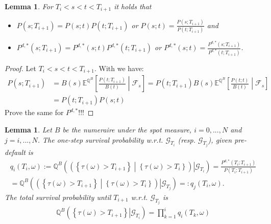\documentclass[12pt]{article}
\newtheorem{lemma}[theorem]{Lemma}
\begin{document}
	\begin{lemma}
		For $T_i < s < t < T_{i+1}$ it holds that
		\begin{itemize}
			\item $P(s;T_{i+1}) = P(s;t)P(t;T_{i+1})$ or 
			$P(s;t) = \frac{P(s;T_{i+1})}{P(t;T_{i+1})}$ and
			\item $P^{d,*}(s;T_{i+1}) = P^{d,*}(s;t)P^{d,*}(t;T_{i+1})$ or 
			$P^{d,*}(s;t) = \frac{P^{d,*}(s;T_{i+1})}{P^{d,*}(t;T_{i+1})}$.
		\end{itemize}
	\end{lemma}
	\begin{proof}
		Let $T_i < s < t < T_{i+1}$. With  we have: 
		\begin{align*}
			P(s;T_{i+1}) &= B(s) \mathbb{E}^{\mathbb{Q}^B}\left[\left.\frac{P(t;T_{i+1})}{B(t)} \; \right| \; \mathcal{F}_s\right] = P(t;T_{i+1})B(s)\mathbb{E}^{\mathbb{Q}^B}\left[\left.\frac{P(t;t)}{B(t)} \; \right| \; \mathcal{F}_s\right]\\
			&=P(t;T_{i+1})P(s;t)
		\end{align*}
		\color{red}Prove the same for $P^{d,*}$!!!\color{black}
	\end{proof}
	\begin{lemma}
		Let $B$ be the numeraire under the spot measure, $i = 0, ..., N$ and $j = i, ..., N$.
		The one-step survival probability w.r.t. $\mathcal{G}_{T_i}$ (resp. $\mathcal{G}_{T_j}$), given pre-default is
		\begin{align}
			q_i(T_i, \omega) := \mathbb{Q}^B\left( \left. \left( \left.\left\{\tau(\omega) > T_{i+1} \right\}  \;\right|\; \left\{\tau(\omega) > T_{i} \right\} \right) \right| \mathcal{G}_{T_i} \right) = \frac{P^{d,*}(T_i;T_{i+1})}{P(T_i;T_{i+1})} \label{eq:oneStepSProbOne}\\
			= \mathbb{Q}^B\left( \left. \left( \left.\left\{\tau(\omega) > T_{i+1} \right\}  \;\right|\; \left\{\tau(\omega) > T_{i} \right\} \right) \right| \mathcal{G}_{T_j} \right) =: q_j(T_i, \omega).
			\label{eq:oneStepSProbTwo}
		\end{align}
		The total survival probability  until $T_{i+1}$ w.r.t. $\mathcal{G}_{T_j}$ is 
		\begin{align}\label{eq:survivalProbTotal}
			\mathbb{Q}^B\left( \left. \left\{\tau(\omega) > T_{i+1} \right\}  \right| \mathcal{G}_{T_i} \right) = \prod_{k=1}^{i}q_i(T_k, \omega)
		\end{align}
	\end{lemma}
\end{document}
